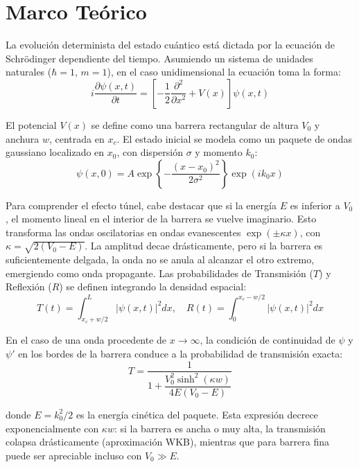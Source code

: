 \section{Marco Teórico}

La evolución determinista del estado cuántico está dictada por la ecuación de Schrödinger dependiente del tiempo. Asumiendo un sistema de unidades naturales ($\hbar = 1$, $m = 1$), en el caso unidimensional la ecuación toma la forma:
\begin{equation}
    i \frac{\partial \psi(x,t)}{\partial t} = \left[ -\frac{1}{2} \frac{\partial^2}{\partial x^2} + V(x) \right] \psi(x,t)
\end{equation}

El potencial $V(x)$ se define como una barrera rectangular de altura $V_0$ y anchura $w$, centrada en $x_c$. El estado inicial se modela como un paquete de ondas gaussiano localizado en $x_0$, con dispersión $\sigma$ y momento $k_0$:
\begin{equation}
    \psi(x,0) = A \exp\left\{-\frac{(x - x_0)^2}{2\sigma^2}\right\} \exp(i k_0 x)
\end{equation}

Para comprender el efecto túnel, cabe destacar que si la energía $E$ es inferior a $V_0$, el momento lineal en el interior de la barrera se vuelve imaginario. Esto transforma las ondas oscilatorias en ondas evanescentes $\exp(\pm \kappa x)$, con $\kappa = \sqrt{2(V_0 - E)}$. La amplitud decae drásticamente, pero si la barrera es suficientemente delgada, la onda no se anula al alcanzar el otro extremo, emergiendo como onda propagante. Las probabilidades de Transmisión ($T$) y Reflexión ($R$) se definen integrando la densidad espacial:
\begin{equation}
    T(t) = \int_{x_c + w/2}^{L} |\psi(x,t)|^2 dx, \quad R(t) = \int_{0}^{x_c - w/2} |\psi(x,t)|^2 dx
\end{equation}

En el caso de una onda procedente de $x\to \infty$, la condición de continuidad de $\psi$ y $\psi'$ en los bordes de la barrera conduce a
la probabilidad de transmisión exacta:
\begin{equation}
    T = \frac{1}{1 + \dfrac{V_0^2 \sinh^2(\kappa w)}{4E(V_0-E)}}
    \label{eq:T_analitica}
\end{equation}

\noindent donde $E = k_0^2/2$ es la energía cinética del paquete. Esta expresión decrece exponencialmente con $\kappa w$: si la barrera es ancha o muy alta, la transmisión colapsa drásticamente (aproximación WKB), mientras que para barrera fina puede ser apreciable incluso con $V_0 \gg E$.

